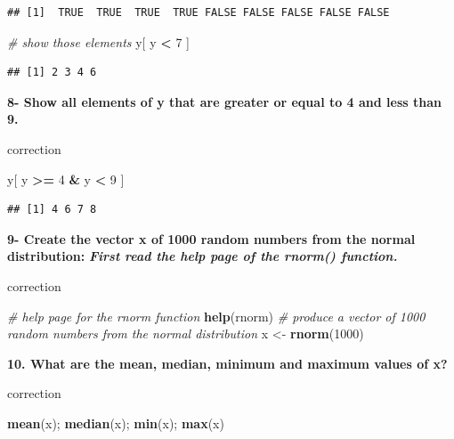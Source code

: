 \documentclass[]{book}
\newenvironment{Shaded}{\begin{snugshade}}{\end{snugshade}}
\newcommand{\CommentTok}[1]{\textcolor[rgb]{0.56,0.35,0.01}{\textit{#1}}}
\newcommand{\DecValTok}[1]{\textcolor[rgb]{0.00,0.00,0.81}{#1}}
\newcommand{\KeywordTok}[1]{\textcolor[rgb]{0.13,0.29,0.53}{\textbf{#1}}}
\newcommand{\NormalTok}[1]{#1}
\newcommand{\OperatorTok}[1]{\textcolor[rgb]{0.81,0.36,0.00}{\textbf{#1}}}
\newcommand{\StringTok}[1]{\textcolor[rgb]{0.31,0.60,0.02}{#1}}
\begin{document}
\begin{verbatim}
## [1]  TRUE  TRUE  TRUE  TRUE FALSE FALSE FALSE FALSE FALSE
\end{verbatim}

\begin{Shaded}
\begin{Highlighting}[]
\CommentTok{# show those elements }
\NormalTok{y[ y }\OperatorTok{<}\StringTok{ }\DecValTok{7}\NormalTok{ ]}
\end{Highlighting}
\end{Shaded}

\begin{verbatim}
## [1] 2 3 4 6
\end{verbatim}

\textbf{8- Show all elements of y that are greater or equal to 4 and less than 9.}

correction

\begin{Shaded}
\begin{Highlighting}[]
\NormalTok{y[ y }\OperatorTok{>=}\StringTok{ }\DecValTok{4} \OperatorTok{&}\StringTok{ }\NormalTok{y }\OperatorTok{<}\StringTok{ }\DecValTok{9}\NormalTok{ ]}
\end{Highlighting}
\end{Shaded}

\begin{verbatim}
## [1] 4 6 7 8
\end{verbatim}

\textbf{9- Create the vector x of 1000 random numbers from the normal distribution:}
\textbf{\emph{First read the help page of the rnorm() function.}}

correction

\begin{Shaded}
\begin{Highlighting}[]
\CommentTok{# help page for the rnorm function}
\KeywordTok{help}\NormalTok{(rnorm)}
\CommentTok{# produce a vector of 1000 random numbers from the normal distribution}
\NormalTok{x <-}\StringTok{ }\KeywordTok{rnorm}\NormalTok{(}\DecValTok{1000}\NormalTok{)}
\end{Highlighting}
\end{Shaded}

\textbf{10. What are the mean, median, minimum and maximum values of x?}

correction

\begin{Shaded}
\begin{Highlighting}[]
\KeywordTok{mean}\NormalTok{(x); }\KeywordTok{median}\NormalTok{(x); }\KeywordTok{min}\NormalTok{(x); }\KeywordTok{max}\NormalTok{(x)}
\end{Highlighting}
\end{Shaded}
\end{document}
